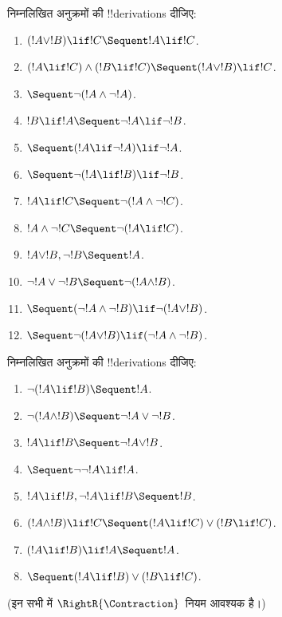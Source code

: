 \documentclass[../../../include/open-logic-section]{subfiles}
\begin{document}
\begin{prob}
निम्नलिखित अनुक्रमों की !!{derivation}s दीजिए:
\begin{enumerate}
\item $(!A \lor !B) \lif !C \Sequent !A \lif !C$.
\item $(!A \lif !C) \land (!B \lif !C) \Sequent (!A \lor !B) \lif !C$.
\item $\Sequent \lnot(!A \land \lnot !A)$.
\item $!B \lif !A \Sequent \lnot !A \lif \lnot !B$.
\item $\Sequent (!A \lif \lnot !A) \lif \lnot !A$.
\item $\Sequent \lnot(!A \lif !B) \lif \lnot !B$.
\item $!A \lif !C \Sequent \lnot (!A \land \lnot !C)$.
\item $!A \land \lnot !C \Sequent \lnot (!A \lif !C)$.
\item $!A \lor !B, \lnot !B \Sequent !A$.
\item $\lnot !A \lor \lnot !B \Sequent \lnot(!A \land !B)$.
\item $\Sequent (\lnot !A \land \lnot !B) \lif\lnot(!A \lor !B)$.
\item $\Sequent \lnot(!A \lor !B) \lif (\lnot !A \land \lnot !B)$.
\end{enumerate}
\end{prob}

\begin{prob}
निम्नलिखित अनुक्रमों की !!{derivation}s दीजिए:
\begin{enumerate}
\item $\lnot(!A \lif !B) \Sequent !A$.
\item $\lnot(!A \land !B) \Sequent \lnot !A \lor \lnot !B$.
\item $!A \lif !B \Sequent \lnot !A \lor !B$.
\item $\Sequent \lnot \lnot !A \lif !A$.
\item $!A \lif !B, \lnot !A \lif !B \Sequent !B$.
\item $(!A \land !B) \lif !C \Sequent (!A \lif !C) \lor (!B \lif !C)$.
\item $(!A \lif !B) \lif !A \Sequent !A$.
\item $\Sequent (!A \lif !B) \lor (!B \lif !C)$.
\end{enumerate}
(इन सभी में $\RightR{\Contraction}$~नियम आवश्यक है।)
\end{prob}
\end{document}
